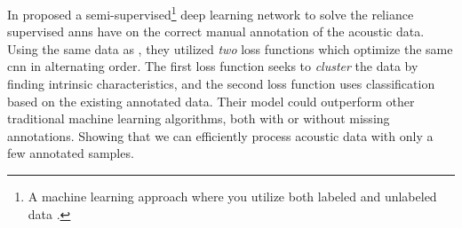     In \citeyear{semtantic-segm2021choi} \citet{semtantic-segm2021choi} proposed  a semi-supervised\footnote{A machine learning approach where you utilize both labeled and unlabeled data \cite{Goodfellow-et-al-2016}.} deep learning network to solve the reliance supervised \gls{ann}s have on the correct manual annotation of the acoustic data. Using the same data as \citet{brautaset2020acoustic}, they utilized \textit{two} loss functions which optimize the same \gls{cnn} in alternating order. The first loss function seeks to \textit{cluster} the data by finding intrinsic characteristics, and the second loss function uses classification based on the existing annotated data. Their model could outperform other traditional machine learning algorithms, both with or without missing annotations. Showing that we can efficiently process acoustic data with only a few annotated samples.



%        









        
        
        
        
        

        
        
        
        
        
        
 


